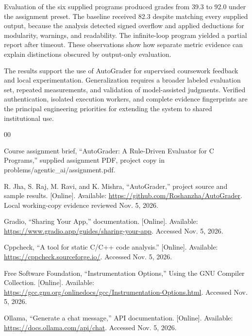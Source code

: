 \documentclass[conference]{IEEEtran}
\begin{document}
Evaluation of the six supplied programs produced grades from 39.3 to 92.0 under the assignment preset. The baseline received 82.3 despite matching every supplied output, because the analysis detected signed overflow and applied deductions for modularity, warnings, and readability. The infinite-loop program yielded a partial report after timeout. These observations show how separate metric evidence can explain distinctions obscured by output-only evaluation.


The results support the use of AutoGrader for supervised coursework feedback and local experimentation. Generalization requires a broader labeled evaluation set, repeated measurements, and validation of model-assisted judgments. Verified authentication, isolated execution workers, and complete evidence fingerprints are the principal engineering priorities for extending the system to shared institutional use.


\begin{thebibliography}{00}

Course assignment brief, ``AutoGrader: A Rule-Driven Evaluator for C Programs,'' supplied assignment PDF, project copy in problems/agentic\_ai/assignment.pdf.

R. Jha, S. Raj, M. Ravi, and K. Mishra, ``AutoGrader,'' project source and sample results. [Online]. Available: \url{https://github.com/Roshanzha/AutoGrader}. Local working-copy evidence reviewed Nov. 5, 2026.

Gradio, ``Sharing Your App,'' documentation. [Online]. Available: \url{https://www.gradio.app/guides/sharing-your-app}. Accessed Nov. 5, 2026.

Cppcheck, ``A tool for static C/C++ code analysis.'' [Online]. Available: \url{https://cppcheck.sourceforge.io/}. Accessed Nov. 5, 2026.

Free Software Foundation, ``Instrumentation Options,'' Using the GNU Compiler Collection. [Online]. Available: \url{https://gcc.gnu.org/onlinedocs/gcc/Instrumentation-Options.html}. Accessed Nov. 5, 2026.

Ollama, ``Generate a chat message,'' API documentation. [Online]. Available: \url{https://docs.ollama.com/api/chat}. Accessed Nov. 5, 2026.

\end{thebibliography}
\end{document}
